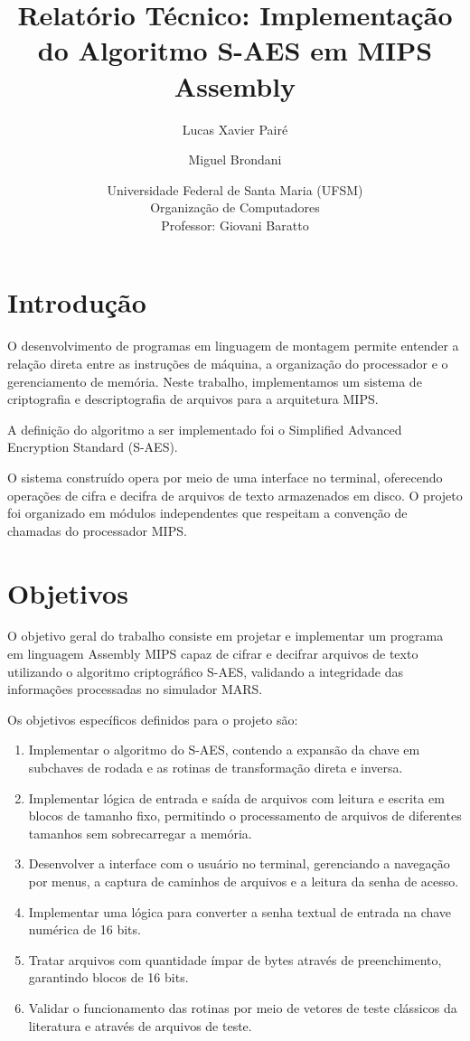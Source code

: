\documentclass[12pt,a4paper]{article}
\title{\textbf{Relatório Técnico: Implementação do Algoritmo S-AES em MIPS Assembly}}
\author{Lucas Xavier Pairé \and Miguel Brondani}
\date{
    Universidade Federal de Santa Maria (UFSM) \\
    Organização de Computadores \\
    Professor: Giovani Baratto
}
\begin{document}
\maketitle

\section{Introdução}

O desenvolvimento de programas em linguagem de montagem permite entender a relação direta entre as instruções de máquina, a organização do processador e o gerenciamento de memória. Neste trabalho, implementamos um sistema de criptografia e descriptografia de arquivos para a arquitetura MIPS.

A definição do algoritmo a ser implementado foi o Simplified Advanced Encryption Standard (S-AES).

O sistema construído opera por meio de uma interface no terminal, oferecendo operações de cifra e decifra de arquivos de texto armazenados em disco. O projeto foi organizado em módulos independentes que respeitam a convenção de chamadas do processador MIPS.

\section{Objetivos}

O objetivo geral do trabalho consiste em projetar e implementar um programa em linguagem Assembly MIPS capaz de cifrar e decifrar arquivos de texto utilizando o algoritmo criptográfico S-AES, validando a integridade das informações processadas no simulador MARS.

Os objetivos específicos definidos para o projeto são:

\begin{enumerate}
    \item Implementar o algoritmo do S-AES, contendo a expansão da chave em subchaves de rodada e as rotinas de transformação direta e inversa.
    \item Implementar lógica de entrada e saída de arquivos com leitura e escrita em blocos de tamanho fixo, permitindo o processamento de arquivos de diferentes tamanhos sem sobrecarregar a memória.
    \item Desenvolver a interface com o usuário no terminal, gerenciando a navegação por menus, a captura de caminhos de arquivos e a leitura da senha de acesso.
    \item Implementar uma lógica para converter a senha textual de entrada na chave numérica de 16 bits.
    \item Tratar arquivos com quantidade ímpar de bytes através de preenchimento, garantindo blocos de 16 bits.
    \item Validar o funcionamento das rotinas por meio de vetores de teste clássicos da literatura e através de arquivos de teste.
\end{enumerate}
\end{document}
